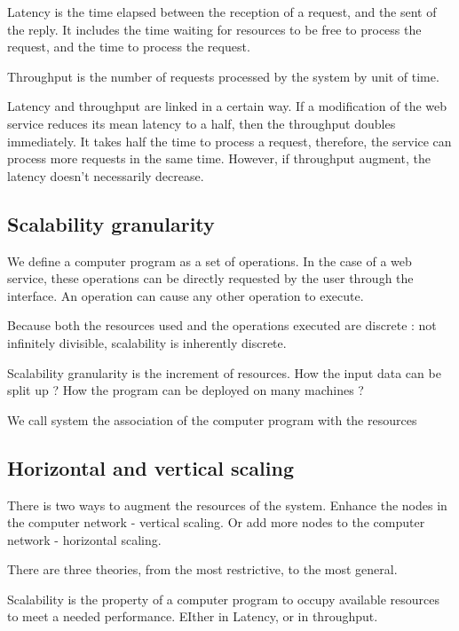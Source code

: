 Latency is the time elapsed between the reception of a request, and the sent of the reply.
It includes the time waiting for resources to be free to process the request, and the time to process the request.

Throughput is the number of requests processed by the system by unit of time.

Latency and throughput are linked in a certain way.
If a modification of the web service reduces its mean latency to a half, then the throughput doubles immediately.
It takes half the time to process a request, therefore, the service can process more requests in the same time.
However, if throughput augment, the latency doesn't necessarily decrease.

\subsection{Scalability granularity}

We define a computer program as a set of operations.
In the case of a web service, these operations can be directly requested by the user through the interface.
An operation can cause any other operation to execute.

Because both the resources used and the operations executed are discrete : not infinitely divisible, scalability is inherently discrete.


Scalability granularity is the increment of resources.
How the input data can be split up ?
How the program can be deployed on many machines ?






We call system the association of the computer program with the resources


\subsection{Horizontal and vertical scaling}

There is two ways to augment the resources of the system.
Enhance the nodes in the computer network - vertical scaling.
Or add more nodes to the computer network - horizontal scaling.



There are three theories, from the most restrictive, to the most general.


Scalability is the property of a computer program to occupy available resources to meet a needed performance.
EIther in Latency, or in throughput.





